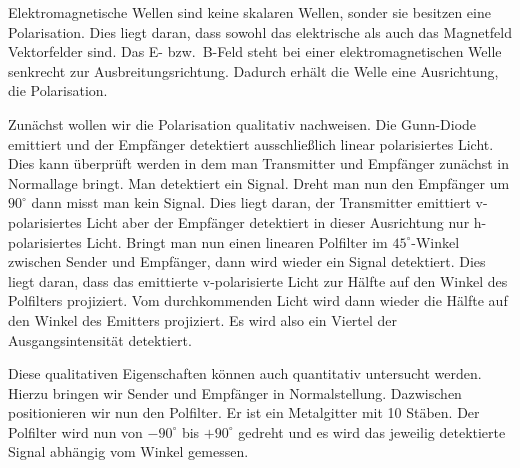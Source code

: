 \documentclass[a4paper,10pt,twocolumn]{article}
\begin{document}
%
    
    Elektromagnetische Wellen sind keine skalaren Wellen, sonder sie besitzen eine Polarisation.
    Dies liegt daran, dass sowohl das elektrische als auch das Magnetfeld Vektorfelder sind.
    Das E- bzw.\ B-Feld steht bei einer elektromagnetischen Welle senkrecht zur Ausbreitungsrichtung.
    Dadurch erhält die Welle eine Ausrichtung, die Polarisation.
    
    Zunächst wollen wir die Polarisation qualitativ nachweisen.
    Die Gunn-Diode emittiert und der Empfänger detektiert ausschließlich linear polarisiertes Licht.
    Dies kann überprüft werden in dem man Transmitter und Empfänger zunächst in Normallage bringt.
    Man detektiert ein Signal.
    Dreht man nun den Empfänger um $90^\circ$ dann misst man kein Signal.
    Dies liegt daran, der Transmitter emittiert v-polarisiertes Licht aber der Empfänger detektiert in
    dieser Ausrichtung nur h-polarisiertes Licht.
    Bringt man nun einen linearen Polfilter im $45^\circ$-Winkel zwischen Sender und Empfänger, dann wird
    wieder ein Signal detektiert.
    Dies liegt daran, dass das emittierte v-polarisierte Licht zur Hälfte auf den Winkel des Polfilters
    projiziert. 
    Vom durchkommenden Licht wird dann wieder die Hälfte auf den Winkel des Emitters projiziert.
    Es wird also ein Viertel der Ausgangsintensität detektiert.
    
    Diese qualitativen Eigenschaften können auch quantitativ untersucht werden.
    Hierzu bringen wir Sender und Empfänger in Normalstellung.
    Dazwischen positionieren wir nun den Polfilter.
    Er ist ein Metalgitter mit 10 Stäben.
    Der Polfilter wird nun von $-90^\circ$ bis $+90^\circ$ gedreht und es wird das jeweilig detektierte Signal
    abhängig vom Winkel gemessen.
    
\end{document}
